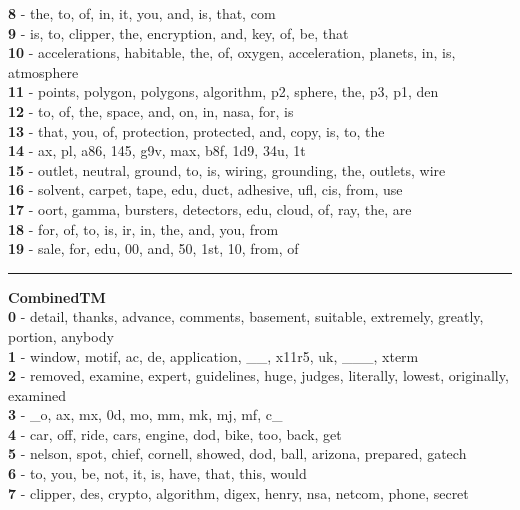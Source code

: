 \textbf{8} - the, to, of, in, it, you, and, is, that, com\\
\textbf{9} - is, to, clipper, the, encryption, and, key, of, be, that\\
\textbf{10} - accelerations, habitable, the, of, oxygen, acceleration, planets, in, is, atmosphere\\
\textbf{11} - points, polygon, polygons, algorithm, p2, sphere, the, p3, p1, den\\
\textbf{12} - to, of, the, space, and, on, in, nasa, for, is\\
\textbf{13} - that, you, of, protection, protected, and, copy, is, to, the\\
\textbf{14} - ax, pl, a86, 145, g9v, max, b8f, 1d9, 34u, 1t\\
\textbf{15} - outlet, neutral, ground, to, is, wiring, grounding, the, outlets, wire\\
\textbf{16} - solvent, carpet, tape, edu, duct, adhesive, ufl, cis, from, use\\
\textbf{17} - oort, gamma, bursters, detectors, edu, cloud, of, ray, the, are\\
\textbf{18} - for, of, to, is, ir, in, the, and, you, from\\
\textbf{19} - sale, for, edu, 00, and, 50, 1st, 10, from, of\\
\hrule\vspace{2mm}
\noindent
\textbf{CombinedTM}\vspace{2mm}\\
\vspace{2mm}
\noindent
\textbf{0} - detail, thanks, advance, comments, basement, suitable, extremely, greatly, portion, anybody\\
\textbf{1} - window, motif, ac, de, application, \_\_, x11r5, uk, \_\_\_, xterm\\
\textbf{2} - removed, examine, expert, guidelines, huge, judges, literally, lowest, originally, examined\\
\textbf{3} - \_o, ax, mx, 0d, mo, mm, mk, mj, mf, c\_\\
\textbf{4} - car, off, ride, cars, engine, dod, bike, too, back, get\\
\textbf{5} - nelson, spot, chief, cornell, showed, dod, ball, arizona, prepared, gatech\\
\textbf{6} - to, you, be, not, it, is, have, that, this, would\\
\textbf{7} - clipper, des, crypto, algorithm, digex, henry, nsa, netcom, phone, secret\\
